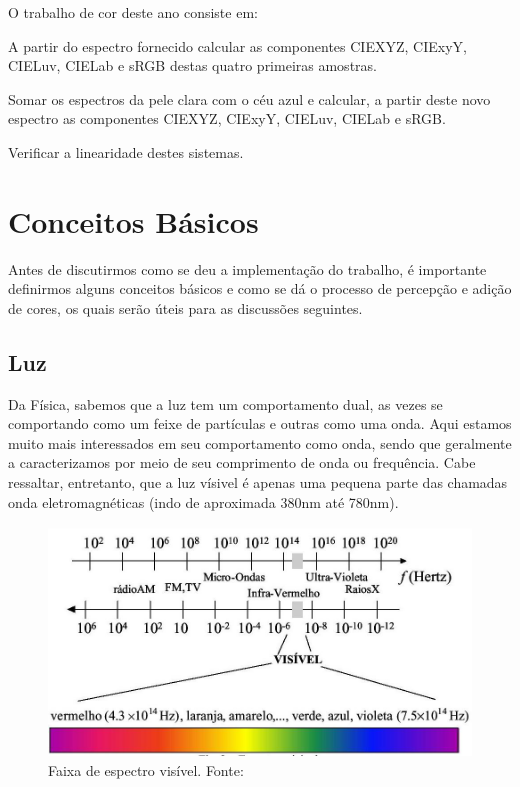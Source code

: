 \par
O trabalho de cor deste ano consiste em:
\begin{list}{:~}{}
\item A partir do espectro fornecido calcular as componentes CIEXYZ,
CIExyY, CIELuv, CIELab e sRGB destas quatro primeiras amostras.
\item Somar os espectros da pele clara com o céu azul e calcular, a partir deste
novo espectro as componentes CIEXYZ, CIExyY, CIELuv, CIELab e sRGB.
\item Verificar a linearidade destes sistemas.
\end{list}

\section{Conceitos Básicos}
\par
Antes de discutirmos como se deu a implementação do trabalho, é importante
definirmos alguns conceitos básicos e como se dá o processo de percepção e
adição de cores, os quais serão úteis para as discussões seguintes.

\subsection{Luz}
\par
Da Física, sabemos que a luz tem um comportamento dual, as vezes se comportando
como um feixe de partículas e outras como uma onda. Aqui estamos muito mais
interessados em seu comportamento como onda, sendo que geralmente a
caracterizamos por meio de seu comprimento de onda ou frequência. Cabe
ressaltar, entretanto, que a luz vísivel é apenas uma pequena parte das
chamadas onda eletromagnéticas (indo de aproximada 380nm até 780nm).

\begin{figure}[!htb]
     \centering
     \includegraphics[scale=0.4]{img/visible_spectrum.jpg}
     \caption{Faixa de espectro visível. Fonte:
}
     \label{fig:visible_spectrum}
\end{figure}


